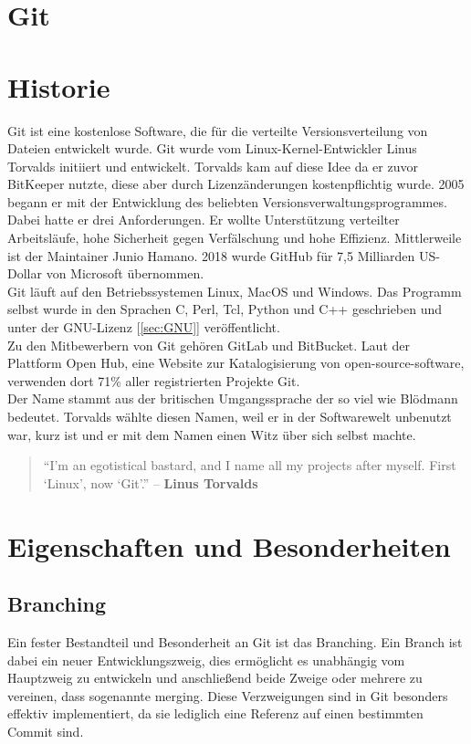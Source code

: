 \newpage
\clearpage
\section{Git}\label{sec:Git}
\small{\cite{git_about}}
\section*{Historie}
Git ist eine kostenlose Software, die für die verteilte Versionsverteilung von Dateien entwickelt wurde. Git wurde vom Linux-Kernel-Entwickler Linus Torvalds initiiert und entwickelt. Torvalds kam auf diese Idee da er zuvor BitKeeper nutzte, diese aber durch Lizenzänderungen kostenpflichtig wurde. 2005 begann er mit der Entwicklung des beliebten Versionsverwaltungsprogrammes. Dabei hatte er drei Anforderungen. Er wollte Unterstützung verteilter Arbeitsläufe, hohe Sicherheit gegen Verfälschung und hohe Effizienz. Mittlerweile ist der Maintainer Junio Hamano. 2018 wurde GitHub für 7,5 Milliarden US-Dollar von Microsoft übernommen. \\
Git läuft auf den Betriebssystemen Linux, MacOS und Windows. Das Programm selbst wurde in den Sprachen C, Perl, Tcl, Python und C++ geschrieben und unter der GNU-Lizenz [\ref{sec:GNU}] veröffentlicht. 
\\
Zu den Mitbewerbern von Git gehören GitLab und BitBucket. Laut der Plattform Open Hub, eine Website zur Katalogisierung von open-source-software, verwenden dort 71\% aller registrierten Projekte Git. \cite{GitMarketshare}
\\
Der Name stammt aus der britischen Umgangssprache der so viel wie Blödmann bedeutet. Torvalds wählte diesen Namen, weil er in der Softwarewelt unbenutzt war, kurz ist und er mit dem Namen einen Witz über sich selbst machte.
\\
\begin{quote}
	“I’m an egotistical bastard, and I name all my projects after myself. First ‘Linux’, now ‘Git’.” – \textbf{Linus Torvalds} \cite{TorvaldsJoke} 
\end{quote}
\clearpage
\newpage
\section*{Eigenschaften und Besonderheiten}
\subsection*{Branching}
Ein fester Bestandteil und Besonderheit an Git ist das Branching. Ein Branch ist dabei ein neuer Entwicklungszweig, dies ermöglicht es unabhängig vom Hauptzweig zu entwickeln und anschließend beide Zweige oder mehrere zu vereinen, dass sogenannte merging. Diese Verzweigungen sind in Git besonders effektiv implementiert, da sie lediglich eine Referenz auf einen bestimmten Commit sind.




